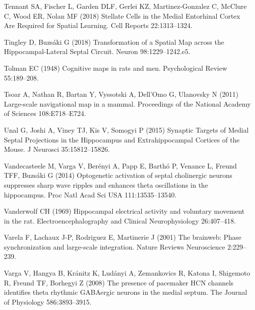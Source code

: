 \documentclass[
  12pt,
  a4paper,
  openany]{book}
\newlength{\cslhangindent}
\newlength{\cslentryspacingunit} %
\newenvironment{CSLReferences}[2] %
 {%
  \setlength{\parindent}{0pt}
  \ifodd #1
  \let\oldpar\par
  \def\par{\hangindent=\cslhangindent\oldpar}
  \fi
  \setlength{\parskip}{#2\cslentryspacingunit}
 }%
 {}
\begin{document}
\begin{CSLReferences}{1}{0}
\leavevmode{}%
Tennant SA, Fischer L, Garden DLF, Gerlei KZ, Martinez-Gonzalez C, McClure C, Wood ER, Nolan MF (2018) Stellate {Cells} in the {Medial} {Entorhinal} {Cortex} {Are} {Required} for {Spatial} {Learning}. Cell Reports 22:1313--1324.

\leavevmode{}%
Tingley D, Buzsáki G (2018) Transformation of a {Spatial} {Map} across the {Hippocampal}-{Lateral} {Septal} {Circuit}. Neuron 98:1229--1242.e5.

\leavevmode{}%
Tolman EC (1948) Cognitive maps in rats and men. Psychological Review 55:189--208.

\leavevmode{}%
Tsoar A, Nathan R, Bartan Y, Vyssotski A, Dell'Omo G, Ulanovsky N (2011) Large-scale navigational map in a mammal. Proceedings of the National Academy of Sciences 108:E718--E724.

\leavevmode{}%
Unal G, Joshi A, Viney TJ, Kis V, Somogyi P (2015) Synaptic {Targets} of {Medial} {Septal} {Projections} in the {Hippocampus} and {Extrahippocampal} {Cortices} of the {Mouse}. J Neurosci 35:15812--15826.

\leavevmode{}%
Vandecasteele M, Varga V, Berényi A, Papp E, Barthó P, Venance L, Freund TFF, Buzsáki G (2014) Optogenetic activation of septal cholinergic neurons suppresses sharp wave ripples and enhances theta oscillations in the hippocampus. Proc Natl Acad Sci USA 111:13535--13540.

\leavevmode{}%
Vanderwolf CH (1969) Hippocampal electrical activity and voluntary movement in the rat. Electroencephalography and Clinical Neurophysiology 26:407--418.

\leavevmode{}%
Varela F, Lachaux J-P, Rodriguez E, Martinerie J (2001) The brainweb: {Phase} synchronization and large-scale integration. Nature Reviews Neuroscience 2:229--239.

\leavevmode{}%
Varga V, Hangya B, Kránitz K, Ludányi A, Zemankovics R, Katona I, Shigemoto R, Freund TF, Borhegyi Z (2008) The presence of pacemaker {HCN} channels identifies theta rhythmic {GABAergic} neurons in the medial septum. The Journal of Physiology 586:3893--3915.


\end{CSLReferences}
\end{document}
